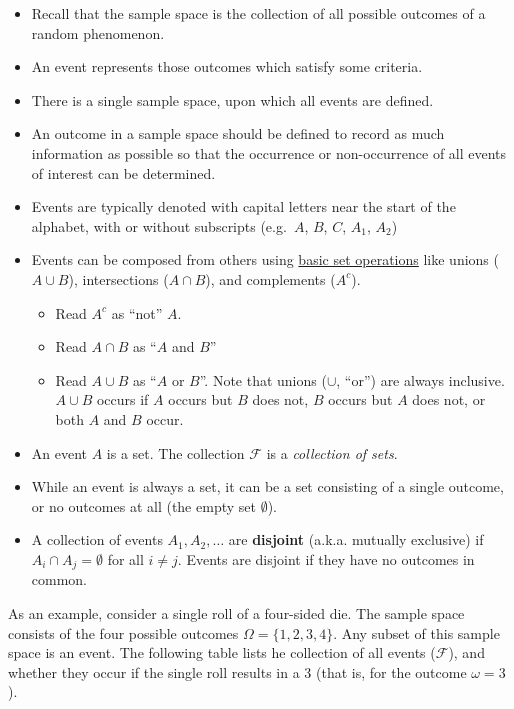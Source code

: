 \documentclass[
]{book}
\providecommand{\tightlist}{%
  \setlength{\itemsep}{0pt}\setlength{\parskip}{0pt}}
\theoremstyle{definition}
\theoremstyle{definition}
\theoremstyle{definition}
\theoremstyle{remark}
\begin{document}
\begin{itemize}
\tightlist
\item
  Recall that the sample space is the collection of all possible
  outcomes of a random phenomenon.
\item
  An event represents those outcomes which satisfy some criteria.
\item
  There is a single sample space, upon which all events are defined.
\item
  An outcome in a sample space should be defined to record as much information as possible so that the occurrence or non-occurrence of all events of interest can be determined.
\item
  Events are typically denoted with capital letters near the start of the alphabet, with or without subscripts (e.g.~\(A\), \(B\), \(C\), \(A_1\), \(A_2\))
\item
  Events can be composed from others using \href{https://en.wikipedia.org/wiki/Set_(mathematics)\#Basic_operations}{basic set operations} like unions (\(A\cup B\)), intersections (\(A \cap B\)), and complements (\(A^c\)).

  \begin{itemize}
  \tightlist
  \item
    Read \(A^c\) as ``not'' \(A\).
  \item
    Read \(A\cap B\) as ``\(A\) and \(B\)''
  \item
    Read \(A \cup B\) as ``\(A\) or \(B\)''. Note that unions (\(\cup\), ``or'') are always inclusive. \(A\cup B\) occurs if \(A\) occurs but \(B\) does not, \(B\) occurs but \(A\) does not, or both \(A\) and \(B\) occur.
  \end{itemize}
\item
  An event \(A\) is a set. The collection \(\mathcal{F}\) is a \emph{collection of sets}.
\item
  While an event is always a set, it can be a set consisting of a single outcome, or no outcomes at all (the empty set \(\emptyset\)).
\item
  A collection of events \(A_1, A_2, \ldots\) are \textbf{disjoint} (a.k.a. mutually exclusive) if \(A_i \cap A_j = \emptyset\) for all \(i \neq j\). Events are disjoint if they have no outcomes in common.
\end{itemize}

As an example, consider a single roll of a four-sided die. The sample space consists of the four possible outcomes \(\Omega = \{1, 2, 3, 4\}\). Any subset of this sample space is an event. The following table lists he collection of all events (\(\mathcal{F}\)), and whether they occur if the single roll results in a 3 (that is, for the outcome \(\omega=3\)).
\end{document}
